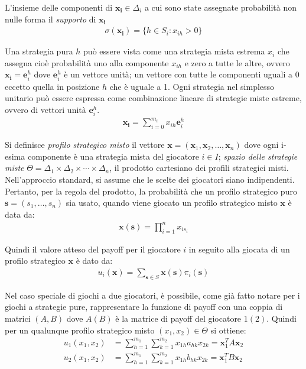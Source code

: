 L’insieme delle componenti di $\mathbf{x_i} \in \Delta_i$ a cui sono state assegnate probabilità non nulle forma il \emph{supporto} di $\mathbf{x_i}$
\begin{align*}
	\sigma(\mathbf{x_i}) = \{h \in S_i : x_{ih} > 0 \}
\end{align*}

Una strategia pura $h$ può essere vista come una strategia mista estrema $x_i$ che assegna cioè probabilità uno alla componente $x_{ih}$ e zero a tutte le altre, ovvero $\mathbf{x_i} = \mathbf{e}^h_i$ dove $\mathbf{e}^h_i$ è un vettore unità; un vettore con tutte le componenti uguali a 0 eccetto quella in posizione $h$ che è uguale a 1. Ogni strategia nel simplesso unitario può essere espressa come combinazione lineare di strategie miste estreme, ovvero di vettori unità $\mathbf{e}^h_i$.
\begin{align*}
    \mathbf{x_i} = \sum_{i=0}^{m_i} x_{ih} \mathbf{e}^h_i
\end{align*}

\newpage

Si definisce \emph{profilo strategico misto} il vettore $\mathbf{x} = (\mathbf{x}_1, \mathbf{x}_2, \dots, \mathbf{x}_n)$ dove
ogni i-esima componente è una strategia mista del giocatore $i \in I$; \emph{spazio delle strategie miste} $\Theta = \Delta_1 \times \Delta_2 \times \cdots \times \Delta_n$, il prodotto cartesiano dei profili strategici misti.\\

Nell'approccio standard, si assume che le scelte dei giocatori siano indipendenti. Pertanto, per la regola del prodotto, la probabilità che un profilo strategico puro $\mathbf{s}=(s_1, \dots, s_n)$ sia usato, quando viene giocato un profilo strategico misto $\mathbf{x}$ è data da:
\begin{align}
    \mathbf{x(s)} = \prod_{i=1}^n x_{is_i}
\end{align}

Quindi il valore atteso del payoff per il giocatore $i$ in seguito alla giocata di un profilo strategico $\mathbf{x}$ è dato da:
\begin{align}
    u_i(\mathbf{x}) = \sum_{\mathbf{s} \in S} \mathbf{x}(\mathbf{s}) \pi_i(\mathbf{s})
\end{align}

Nel caso speciale di giochi a due giocatori, è possibile, come già fatto notare per i giochi a strategie pure, rappresentare la funzione di payoff con una coppia di matrici $(A,B)$ dove $A (B)$ è la matrice di payoff del giocatore $1(2)$. Quindi per un qualunque profilo strategico misto $(x_1,x_2) \in \Theta$ si ottiene:
\begin{align*}
    u_1(x_1, x_2) &= \sum_{h=1}^{m_1} \sum_{k=1}^{m_2} x_{1h} a_{hk} x_{2k} = \mathbf{x}^T_1 A \mathbf{x}_2 \\
    u_2(x_1, x_2) &= \sum_{h=1}^{m_1} \sum_{k=1}^{m_2} x_{1h} b_{hk} x_{2k} = \mathbf{x}^T_1 B \mathbf{x}_2
\end{align*}


